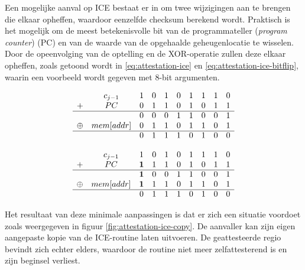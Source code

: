 Een mogelijke aanval op ICE bestaat er in om twee wijzigingen aan te brengen
die elkaar opheffen, waardoor eenzelfde checksum berekend wordt. Praktisch is
het mogelijk om de meest betekenisvolle bit van de programmateller
(\emph{program counter}) (PC) en van de waarde van de opgehaalde
geheugenlocatie te wisselen. Door de opeenvolging van de optelling en de
XOR-operatie zullen deze elkaar opheffen, zoals getoond wordt in
\ref{eq:attestation-ice} en \ref{eq:attestation-ice-bitflip}, waarin een
voorbeeld wordt gegeven met 8-bit argumenten.

\begin{equation} \label{eq:attestation-ice}
\begin{array}{cccccccccc}
       & c_{j-1}    & 1 &	0 &	1 &	0 &	1 &	1 &	1 &	0 \\
+	     & PC	        & 0	& 1	& 1	& 0	& 1	& 0	& 1	& 1 \\
\cline{1-10}
       &            &	0	& 0	& 0	& 1	& 1	& 0	& 0	& 1 \\
\oplus &	mem[addr]	& 0	& 1	& 1 &	0	& 1	& 1	& 0	& 1 \\
\cline{1-10}
       &            &	0	& 1	& 1	& 1	& 0	& 1	& 0	& 0 \\
\end{array}
\end{equation}

\begin{equation} \label{eq:attestation-ice-bitflip}
\begin{array}{cccccccccc}
       & c_{j-1}    & 1 &	0 &	1 &	0 &	1 &	1 &	1 &	0 \\
+	     & PC	        & \bm{1}	& 1	& 1	& 0	& 1	& 0	& 1	& 1 \\
\cline{1-10}
       &            &	\bm{1}	& 0	& 0	& 1	& 1	& 0	& 0	& 1 \\
\oplus &	mem[addr]	& \bm{1}	& 1	& 1 &	0	& 1	& 1	& 0	& 1 \\
\cline{1-10}
       &            &	0	& 1	& 1	& 1	& 0	& 1	& 0	& 0 \\
\end{array}
\end{equation}

Het resultaat van deze minimale aanpassingen is dat er zich een situatie
voordoet zoals weergegeven in figuur \ref{fig:attestation-ice-copy}. De
aanvaller kan zijn eigen aangepaste kopie van de ICE-routine laten uitvoeren.
De geattesteerde regio bevindt zich echter elders, waardoor de routine niet
meer zelfattesterend is en zijn beginsel verliest.

